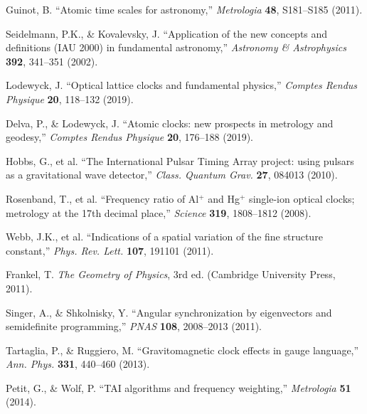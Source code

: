 \documentclass[11pt,a4paper]{article}
\begin{document}

\begin{thebibliography}{99}

Guinot, B. ``Atomic time scales for astronomy,'' \textit{Metrologia} \textbf{48}, S181–S185 (2011).

Seidelmann, P.K., \& Kovalevsky, J. ``Application of the new concepts and definitions (IAU 2000) in fundamental astronomy,'' \textit{Astronomy \& Astrophysics} \textbf{392}, 341–351 (2002).

Lodewyck, J. ``Optical lattice clocks and fundamental physics,'' \textit{Comptes Rendus Physique} \textbf{20}, 118–132 (2019).

Delva, P., \& Lodewyck, J. ``Atomic clocks: new prospects in metrology and geodesy,'' \textit{Comptes Rendus Physique} \textbf{20}, 176–188 (2019).

Hobbs, G., et al. ``The International Pulsar Timing Array project: using pulsars as a gravitational wave detector,'' \textit{Class. Quantum Grav.} \textbf{27}, 084013 (2010).

Rosenband, T., et al. ``Frequency ratio of Al$^+$ and Hg$^+$ single-ion optical clocks; metrology at the 17th decimal place,'' \textit{Science} \textbf{319}, 1808–1812 (2008).

Webb, J.K., et al. ``Indications of a spatial variation of the fine structure constant,'' \textit{Phys. Rev. Lett.} \textbf{107}, 191101 (2011).

Frankel, T. \textit{The Geometry of Physics}, 3rd ed. (Cambridge University Press, 2011).

Singer, A., \& Shkolnisky, Y. ``Angular synchronization by eigenvectors and semidefinite programming,'' \textit{PNAS} \textbf{108}, 2008–2013 (2011).

Tartaglia, P., \& Ruggiero, M. ``Gravitomagnetic clock effects in gauge language,'' \textit{Ann. Phys.} \textbf{331}, 440–460 (2013).

Petit, G., \& Wolf, P. ``TAI algorithms and frequency weighting,'' \textit{Metrologia} \textbf{51} (2014).


\end{thebibliography}
\end{document}
